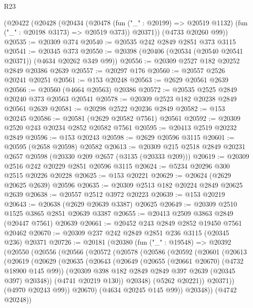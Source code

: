 \begin{lexlean}{R23}
\begin{coremodule}
    (@20422
      (@20428
        (@20434
          (@20478 (fun ("_" : @20199) => @20519 @1132) (fun ("_" : @20198 @3173) => @20519 @373))
          @20371))
      (@4733 @20260 @99))
@20535 := @20309 @374
@20540 := @20535 @242 @2849 @2851 @373 @3115
@20541 := @20345 @373
@20550 := @20398 (@20406 (@20534 (@20540 @20541 @20371)) (@4634 @20262 @349 @99))
@20556 := @20309 @2527 @182 @20252 @2849 @20386 @2639
@20557 := @20297 @176
@20560 := @20557 @2526 @20241 @20251
@20561 := @153 @20248
@20563 := @2629 @20561 @2639
@20566 := @20560 (@4664 @20563) @20386
@20572 := @20535 @2525 @2849 @20240 @373 @20563 @20541
@20578 := @20309 @2523 @182 @20238 @2849 @20561 @2639
@20581 := @20298 @2522 @20236 @2849
@20582 := @153 @20245
@20586 := @20581 (@2629 @20582 @7561) @20561
@20592 := @20309 @2520 @243 @20234 @2852 @20582 @7561
@20595 := @20413 @2519 @20232 @2849
@20596 := @153 @20243
@20598 := @2629 @20596 @3115
@20601 := @20595 (@2658 @20598) @20582
@20613 := @20309 @215 @2518 @2849 @20231 @2657 @20598 (@20330 @209 @2657 (@3135 (@20333 @209)))
@20619 := @20309 @2516 @242 @20229 @2851 @20596 @3115
@20624 := @5234 @20296 @300 @2515 @20226 @20228
@20625 := @153 @20221
@20629 := @20624 (@2629 @20625 @2639) @20596
@20635 := @20309 @2513 @182 @20224 @2849 @20625 @2639
@20638 := @20557 @2512 @3972 @20223
@20639 := @153 @20219
@20643 := @20638 (@2629 @20639 @3387) @20625
@20649 := @20309 @2510 @1525 @3865 @2851 @20639 @3387
@20655 := @20413 @2509 @3863 @2849 (@20447 @7561) @20639
@20661 := @20452 @243 @2849 @2852 @19450 @7561 @20462
@20670 := @20309 @237 @242 @2849 @2851 @236 @3115 (@20345 @236) @20371
@20726 := @20181
    (@20380
      (fun ("_" : @19548) =>
      @20392
        (@20550
          (@20556
            (@20566
              (@20572
                (@20578
                  (@20586
                    (@20592
                      (@20601
                        (@20613
                          (@20619
                            (@20629
                              (@20635
                                (@20643
                                  (@20649
                                    (@20655 (@20661 @20670) (@4732 @18900 @145 @99))
                                    (@20309 @398 @182 @2849 @2849 @397 @2639 (@20345 @397) @20348))
                                  (@4741 @20219 @130))
                                @20348)
                              (@5262 @20221))
                            @20371))
                        (@4970 @20243 @99))
                      @20670)
                    (@4634 @20245 @145 @99))
                  @20348))
              (@4742 @20248))

\end{coremodule}
\end{lexlean}
